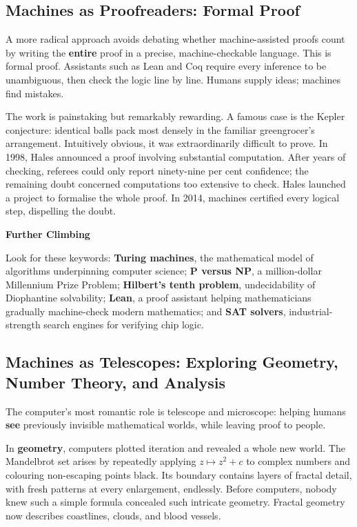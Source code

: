 \subsection{Machines as Proofreaders: Formal Proof}

A more radical approach avoids debating whether machine-assisted proofs count by writing the \textbf{entire} proof in a precise, machine-checkable language. This is formal proof. Assistants such as Lean and Coq require every inference to be unambiguous, then check the logic line by line. Humans supply ideas; machines find mistakes.

The work is painstaking but remarkably rewarding. A famous case is the Kepler conjecture: identical balls pack most densely in the familiar greengrocer's arrangement. Intuitively obvious, it was extraordinarily difficult to prove. In 1998, Hales announced a proof involving substantial computation. After years of checking, referees could only report ninety-nine per cent confidence; the remaining doubt concerned computations too extensive to check. Hales launched a project to formalise the whole proof. In 2014, machines certified every logical step, dispelling the doubt.

\begin{pandeng}
\textbf{Further Climbing}

Look for these keywords: \textbf{Turing machines}, the mathematical model of algorithms underpinning computer science; \textbf{P versus NP}, a million-dollar Millennium Prize Problem; \textbf{Hilbert's tenth problem}, undecidability of Diophantine solvability; \textbf{Lean}, a proof assistant helping mathematicians gradually machine-check modern mathematics; and \textbf{SAT solvers}, industrial-strength search engines for verifying chip logic.
\end{pandeng}

\subsection{Machines as Telescopes: Exploring Geometry, Number Theory, and Analysis}

The computer's most romantic role is telescope and microscope: helping humans \textbf{see} previously invisible mathematical worlds, while leaving proof to people.

In \textbf{geometry}, computers plotted iteration and revealed a whole new world. The Mandelbrot set arises by repeatedly applying $z \mapsto z^2 + c$ to complex numbers and colouring non-escaping points black. Its boundary contains layers of fractal detail, with fresh patterns at every enlargement, endlessly. Before computers, nobody knew such a simple formula concealed such intricate geometry. Fractal geometry now describes coastlines, clouds, and blood vessels.

